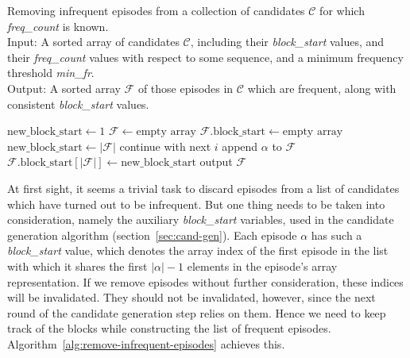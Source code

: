 \begin{algorithm}

\caption{Removing infrequent episodes from a collection of candidates $ \mathcal{C} $ for which \emph{freq\_count} is known. \\
Input: A sorted array of candidates $ \mathcal{C} $, including their \emph{block\_start} values, and their \emph{freq\_count} values with respect to some sequence, and a minimum frequency threshold \emph{min\_fr}. \\
Output: A sorted array $ \mathcal{F} $ of those episodes in $ \mathcal{C} $ which are frequent, along with consistent \emph{block\_start} values.
}

\begin{algorithmic}[1]

\State $ \text{new\_block\_start} \gets 1 $
\State $ \mathcal{F} \gets \text{empty array} $
\State $ \mathcal{F} \text{.block\_start} \gets \text{empty array} $
     \label{alglin:remove-infrequent-episodes:different-block-test}
        \State $ \text{new\_block\_start} \gets | \mathcal{F} | $
    \EndIf
        \State continue with next $ i $
    \EndIf
    \State append $ \alpha $ to $ \mathcal{F} $
    \State $ \mathcal{F} \text{.block\_start}[ | \mathcal{F} | ] \gets \text{new\_block\_start} $
\EndFor
\State output $ \mathcal{F} $

\end{algorithmic}

\label{alg:remove-infrequent-episodes}
\end{algorithm}

At first sight, it seems a trivial task to discard episodes from a list of candidates which have turned out to be infrequent. But one thing needs to be taken into consideration, namely the auxiliary \emph{block\_start} variables, used in the candidate generation algorithm (section~\ref{sec:cand-gen}). Each episode $ \alpha $ has such a \emph{block\_start} value, which denotes the array index of the first episode in the list with which it shares the first $ | \alpha | - 1 $ elements in the episode's array representation. If we remove episodes without further consideration, these indices will be invalidated. They should not be invalidated, however, since the next round of the candidate generation step relies on them. Hence we need to keep track of the blocks while constructing the list of frequent episodes. Algorithm~\ref{alg:remove-infrequent-episodes} achieves this.

